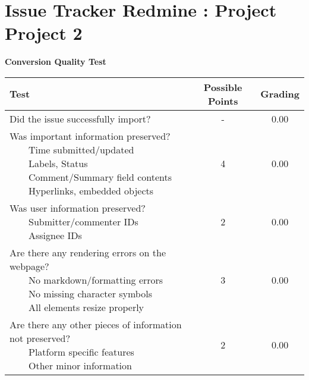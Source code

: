 \documentclass{article}
\newcommand{\tabitem}{~~\llap{\textbullet}~~}
\begin{document}
\\\section{Issue Tracker Redmine : Project Project 2}
\textbf{Conversion Quality Test}\\
\begin{adjustbox}{center}
	\renewcommand{\arraystretch}{1.5}
	\begin{tabular}{ p{6cm} | c | c }
		Test & Possible Points & Grading \\ \hline
		Did the issue successfully import? & - & 0.00 \\
		\hline
		\makecell[l]{
			Was important information preserved? \\
			\tabitem Time submitted/updated \\
			\tabitem Labels, Status \\
			\tabitem Comment/Summary field contents \\
			\tabitem Hyperlinks, embedded objects}
		& 4 & 0.00 \\
		\hline
		\makecell[l]{
			Was user information preserved? \\
			\tabitem Submitter/commenter IDs \\
			\tabitem Assignee IDs
		} & 2 & 0.00 \\
		\hline
		\makecell[{{p{6cm}}}]{
			Are there any rendering errors on the webpage? \\
			\tabitem No markdown/formatting errors \\
			\tabitem No missing character symbols \\
			\tabitem All elements resize properly
		} & 3 & 0.00 \\
		\hline
		\makecell[{{p{6cm}}}]{
			Are there any other pieces of information not preserved? \\
			\tabitem Platform specific features \\
			\tabitem Other minor information
		} & 2 & 0.00 \\
	\end{tabular}
\end{adjustbox}
\\
\end{document}
